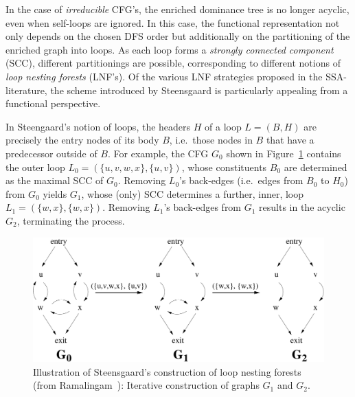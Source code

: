 In the case of \emph{irreducible} CFG's, the enriched dominance tree
is no longer acyclic, even when self-loops are ignored. In this case,
the functional representation not only depends on the chosen DFS order
but additionally on the partitioning of the enriched graph into loops.
As each loop forms a \emph{strongly connected component} (SCC),
different partitionings are possible, corresponding to different
notions of \emph{loop nesting forests} (LNF's). Of the various LNF
strategies proposed in the SSA-literature, the scheme introduced by
Steensgaard is particularly appealing from a functional perspective.

In Steengaard's notion of loops, the headers $H$ of a loop $L=(B,H)$
are precisely the entry nodes of its body $B$, i.e.~those nodes in $B$
that have a predecessor outside of $B$.  For example, the CFG $G_0$
shown in Figure~\ref{FigLoopAnalysisRamalingamSteensgaardConstruction}
contains the outer loop $L_0 = (\{u,v,w,x\}, \{u,v\})$, whose
constituents $B_0$ are determined as the maximal SCC of
$G_0$. Removing $L_0$'s back-edges (i.e.~edges from $B_0$ to $H_0$)
from $G_0$ yields $G_1$, whose (only) SCC determines a further, inner,
loop $L_1 = (\{w,x\},
\{w,x\})$. Removing $L_1$'s back-edges from $G_1$ results in the
acyclic $G_2$, terminating the process.

 \begin{figure}
    \begin{center}
    \includegraphics[scale=0.3]{RamalingamSteensgaardConstruction}
    \end{center}
    \caption{\label{FigLoopAnalysisRamalingamSteensgaardConstruction} 
       Illustration
       of Steensgaard's construction of loop nesting forests (from
       Ramalingam~\cite{DBLP:journals/toplas/Ramalingam02}):
       Iterative construction of graphs $G_1$ and $G_2$.}
  \end{figure} 

